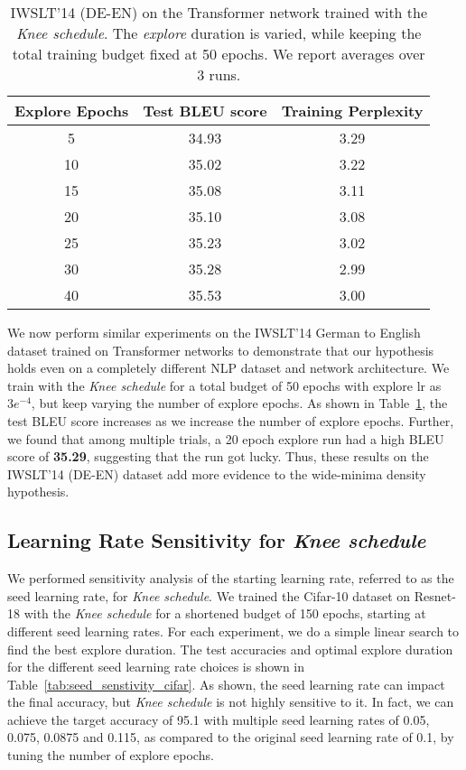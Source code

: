 \documentclass[twoside,11pt]{article}
\newcommand{\lrschedule}{\textit{Knee schedule}}
\begin{document}
\begin{table}[h]
\small
\centering
\caption{IWSLT'14 (DE-EN) on the Transformer network trained with the \lrschedule{}. The \textit{explore} duration is varied, while keeping the total training budget fixed at 50 epochs. We report averages over 3 runs.}

\begin{tabular}{ccc}
  \toprule
  Explore Epochs & Test BLEU score & Training Perplexity \\
  \midrule
5  & 34.93 & 3.29 \\ 
  10 & 35.02 & 3.22 \\ 
  15 & 35.08 & 3.11 \\ 
  20 & 35.10  & 3.08 \\ 
  25 & 35.23 & 3.02 \\ 
  30 & 35.28 & 2.99 \\
  40 & 35.53 & 3.00 \\
  \bottomrule
\end{tabular}
\label{tab:warmup_accuracy_iwslt}
\end{table}

We now perform similar experiments on the IWSLT'14 German to English dataset \citep{iwslt_dataset_cettolo2014} trained on Transformer networks \citep{vaswani2017attention} to demonstrate that our hypothesis holds even on a completely different NLP dataset and network architecture. We train with the \lrschedule{} for a total budget of 50 epochs with explore lr as $3e^{-4}$, but keep varying the number of explore epochs. As shown in Table~\ref{tab:warmup_accuracy_iwslt}, the test BLEU score increases as we increase the number of explore epochs. Further, we found that among multiple trials, a 20 epoch explore run had a high BLEU score of \textbf{35.29}, suggesting that the run got lucky. Thus, these results on the IWSLT'14 (DE-EN) dataset add more evidence to the wide-minima density hypothesis. 

\vspace{6pt} \subsection{Learning Rate Sensitivity for \lrschedule{}}
\label{sec:seed_sensitivity}

We performed sensitivity analysis of the starting learning rate, referred to as the seed learning rate, for \lrschedule{}. We trained the Cifar-10 dataset on Resnet-18 with the \lrschedule{} for a shortened budget of 150 epochs, starting at different seed learning rates. For each experiment, we do a simple linear search to find the best explore duration. The test accuracies and optimal explore duration for the different seed learning rate choices is shown in Table~\ref{tab:seed_senstivity_cifar}. As shown, the seed learning rate can impact the final accuracy, but \lrschedule{} is not highly sensitive to it. In fact, we can achieve the target accuracy of 95.1 with multiple seed learning rates of 0.05, 0.075, 0.0875 and 0.115, as compared to the original seed learning rate of 0.1, by tuning the number of explore epochs.
\end{document}
